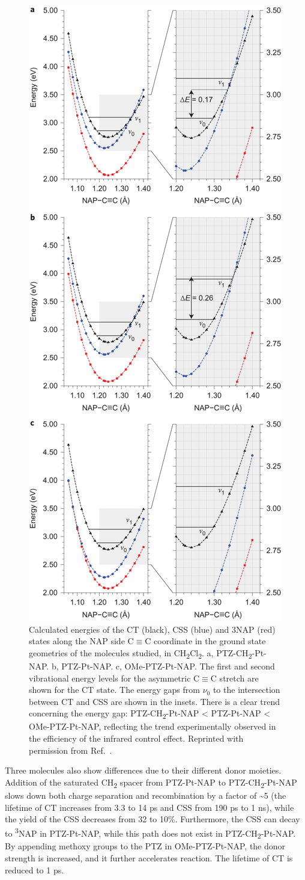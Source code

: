 \begin{figure}[!h]
\includegraphics[width=0.45\columnwidth]{Chapters/chap4/Images/parabola.jpg}
\caption{Calculated energies of the CT (black), CSS (blue) and 3NAP (red) states along the NAP side C$\equiv$C coordinate in the ground state geometries of the molecules studied, in CH\textsubscript{2}Cl\textsubscript{2}. a, PTZ-CH\textsubscript{2}-Pt-NAP. b, PTZ-Pt-NAP. c, OMe-PTZ-Pt-NAP. The first and second vibrational energy levels for the asymmetric C$\equiv$C stretch are shown for the CT state. The energy gaps from $\nu_0$ to the intersection between CT and CSS are shown in the insets. There is a clear trend concerning the energy gap: PTZ-CH\textsubscript{2}-Pt-NAP < PTZ-Pt-NAP < OMe-PTZ-Pt-NAP, reflecting the trend experimentally observed in the efficiency of the infrared control effect. Reprinted with permission from Ref.~\cite{delor2015mechanism}.\label{PTZparabolas}} \end{figure}


Three molecules also show differences due to their different donor moieties. Addition of the saturated CH\textsubscript{2} spacer from PTZ-Pt-NAP to PTZ-CH\textsubscript{2}-Pt-NAP slows down both charge separation and recombination by a factor of \textasciitilde 5 (the lifetime of CT increases from 3.3 to 14 ps and CSS from 190 ps to 1 ns), while the yield of the CSS decreases from 32 to 10\%. Furthermore, the CSS can decay to \textsuperscript{3}NAP in PTZ-Pt-NAP, while this path does not exist in PTZ-CH\textsubscript{2}-Pt-NAP. By appending methoxy groups to the PTZ in OMe-PTZ-Pt-NAP, the donor strength is increased, and it further accelerates reaction. The lifetime of CT is reduced to 1 ps.

